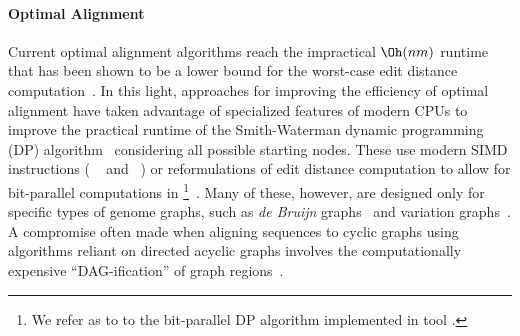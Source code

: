 \paragraph{Optimal Alignment}
Current optimal alignment algorithms reach the impractical $\Oh(nm)$ runtime
that has been shown to be a lower bound for the worst-case edit distance
computation~\cite{backurs2015edit}. In this light, approaches for improving the
efficiency of optimal alignment have taken advantage of specialized features of
modern CPUs to improve the practical runtime of the Smith-Waterman dynamic
programming (DP) algorithm~\cite{smith_comparison_1981} considering all possible
starting nodes. These use modern SIMD instructions (\eg
\vg~\cite{garrison_variation_2018} and \pasgal~\cite{jain_accelerating_2019}) or
reformulations of edit distance computation to allow for bit-parallel
computations in \graphaligner \footnote{We refer as \bitparallel to to the
bit-parallel DP algorithm implemented in \graphaligner tool
\cite{rautiainen_bitparallel_2019}.}~\cite{rautiainen_bitparallel_2019}. Many of
these, however, are designed only for specific types of genome graphs, such as
{\itshape de Bruijn}
graphs~\cite{liu_debga_2016,limasset2019toward} and
variation graphs~\cite{garrison_variation_2018}. A compromise often made when
aligning sequences to cyclic graphs using algorithms reliant on directed acyclic
graphs involves the computationally expensive ``DAG-ification'' of graph
regions~\cite{kavya_sequence_2019,garrison_variation_2018}.